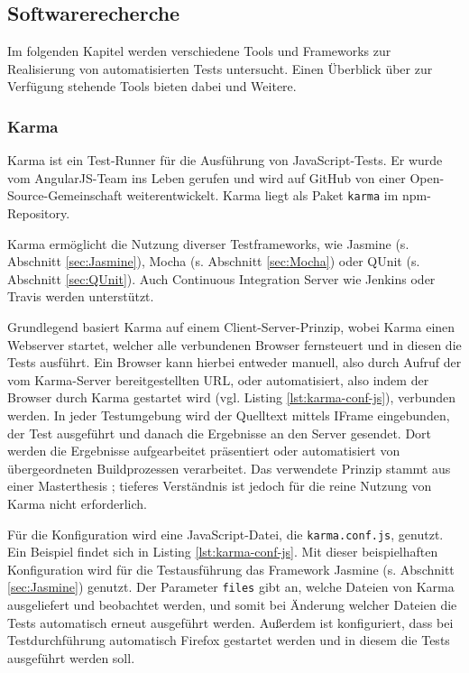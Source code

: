 \subsection{Softwarerecherche}
Im folgenden Kapitel werden verschiedene Tools und Frameworks zur Realisierung von automatisierten Tests untersucht. Einen Überblick über zur Verfügung stehende Tools bieten dabei \cite{unittest-overview} und Weitere.

\subsubsection{Karma}
\label{sec:Karma}
Karma ist ein Test-Runner für die Ausführung von JavaScript-Tests. Er wurde vom AngularJS-Team ins Leben gerufen und wird auf GitHub von einer Open-Source-Gemeinschaft weiterentwickelt.\cite{karma-index} Karma liegt als Paket \texttt{karma} im npm-Repository\cite{karma-faq}.

Karma ermöglicht die Nutzung diverser Testframeworks, wie Jasmine (s. Abschnitt \ref{sec:Jasmine}), Mocha (s. Abschnitt \ref{sec:Mocha}) oder QUnit (s. Abschnitt \ref{sec:QUnit}). Auch Continuous Integration Server wie Jenkins oder Travis werden unterstützt.\cite{karma-faq}

Grundlegend basiert Karma auf einem Client-Server-Prinzip, wobei Karma einen Webserver startet, welcher alle verbundenen Browser fernsteuert und in diesen die Tests ausführt. Ein Browser kann hierbei entweder manuell, also durch Aufruf der vom Karma-Server bereitgestellten URL, oder automatisiert, also indem der Browser durch Karma gestartet wird (vgl. Listing \ref{lst:karma-conf-js}), verbunden werden. In jeder Testumgebung wird der Quelltext mittels IFrame eingebunden, der Test ausgeführt und danach die Ergebnisse an den Server gesendet. Dort werden die Ergebnisse aufgearbeitet präsentiert oder automatisiert von übergeordneten Buildprozessen verarbeitet. Das verwendete Prinzip stammt aus einer Masterthesis \cite{karma-masterThesis}; tieferes Verständnis ist jedoch für die reine Nutzung von Karma nicht erforderlich.\cite{karma-howItWorks}

Für die Konfiguration wird eine JavaScript-Datei, die \texttt{karma.conf.js}, genutzt. Ein Beispiel findet sich in Listing \ref{lst:karma-conf-js}. Mit dieser beispielhaften Konfiguration wird für die Testausführung das Framework Jasmine (s. Abschnitt \ref{sec:Jasmine}) genutzt. Der Parameter \texttt{files} gibt an, welche Dateien von Karma ausgeliefert und beobachtet werden, und somit bei Änderung welcher Dateien die Tests automatisch erneut ausgeführt werden. Außerdem ist konfiguriert, dass bei Testdurchführung automatisch Firefox gestartet werden und in diesem die Tests ausgeführt werden soll.\cite{karma-configurationFile, karma-files}

